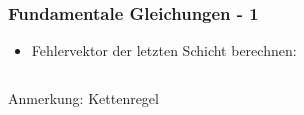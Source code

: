 \begin{frame}
\frametitle{Fundamentale Gleichungen - 1} 

\begin{itemize}
\item Fehlervektor der letzten Schicht berechnen: 
\end{itemize}

\begin{columns}







\begin{block}{Anmerkung: Kettenregel}
\end{block}

\end{columns}



\end{frame}

